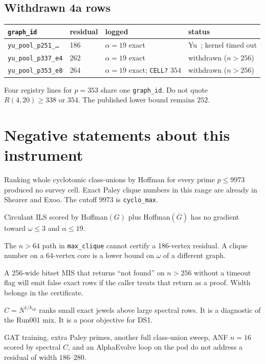 \documentclass[11pt,a4paper]{article}
\begin{document}
\subsection{Withdrawn 4a rows}

\begin{center}
\small
\begin{tabular}{@{}llll@{}}
\toprule
\texttt{graph\_id} & residual & logged & status \\
\midrule
\texttt{yu\_pool\_p251\_\ldots} & 186 & $\alpha=19$ exact & Yu~\cite{yu}; kernel timed out \\
\texttt{yu\_pool\_p337\_e4} & 262 & $\alpha=19$ exact & withdrawn ($n>256$) \\
\texttt{yu\_pool\_p353\_e8} & 264 & $\alpha=19$ exact; \texttt{CELL?} $354$ & withdrawn ($n>256$) \\
\bottomrule
\end{tabular}
\end{center}

Four registry lines for $p=353$ share one \texttt{graph\_id}. Do not
quote $R(4,20)\ge 338$ or $354$. The published lower bound remains
$252$.

\section{Negative statements about this instrument}

Ranking whole cyclotomic class-unions by Hoffman for every prime
$p\le 9973$ produced no survey cell. Exact Paley clique numbers in this
range are already in Shearer and Exoo. The cutoff $9973$ is
\texttt{cyclo\_max}.

Circulant ILS scored by Hoffman$(G)$ plus Hoffman$(\overline{G})$ has
no gradient toward $\omega\le 3$ and $\alpha\le 19$.

The $n>64$ path in \texttt{max\_clique} cannot certify a 186-vertex
residual. A clique number on a 64-vertex core is a lower bound on
$\omega$ of a different graph.

A 256-wide bitset MIS that returns ``not found'' on $n>256$ without a
timeout flag will emit false exact rows if the caller treats that return
as a proof. Width belongs in the certificate.

$C=N^{1/k_{\mathrm{eff}}}$ ranks small exact jewels above large
spectral rows. It is a diagnostic of the Run001 mix. It is a poor
objective for DS1.

GAT training, extra Paley primes, another full class-union sweep, ANF
$n=16$ scored by spectral $C$, and an AlphaEvolve loop on the pod do
not address a residual of width $186$--$280$.
\end{document}
